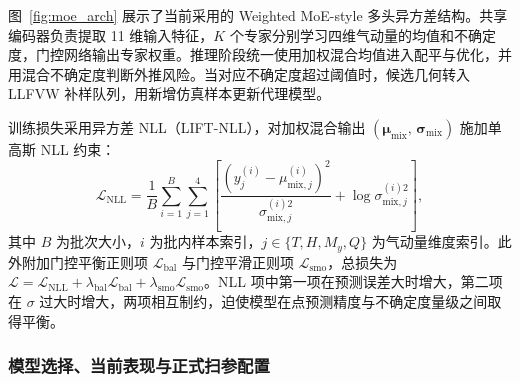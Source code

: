 图~\ref{fig:moe_arch} 展示了当前采用的 Weighted MoE-style 多头异方差结构。共享编码器负责提取 11 维输入特征，$K$ 个专家分别学习四维气动量的均值和不确定度，门控网络输出专家权重。推理阶段统一使用加权混合均值进入配平与优化，并用混合不确定度判断外推风险。当对应不确定度超过阈值时，候选几何转入 LLFVW 补样队列，用新增仿真样本更新代理模型。

训练损失采用异方差 NLL（LIFT-NLL），对加权混合输出 $(\bm{\mu}_{\mathrm{mix}},\,\bm{\sigma}_{\mathrm{mix}})$ 施加单高斯 NLL 约束：
\begin{equation}
\mathcal{L}_{\mathrm{NLL}} = \frac{1}{B}\sum_{i=1}^{B}\sum_{j=1}^{4}
\left[\frac{(y_j^{(i)} - \mu_{\mathrm{mix},j}^{(i)})^2}{\sigma_{\mathrm{mix},j}^{(i)2}} + \log\sigma_{\mathrm{mix},j}^{(i)2}\right],
\end{equation}
其中 $B$ 为批次大小，$i$ 为批内样本索引，$j \in \{T, H, M_y, Q\}$ 为气动量维度索引。此外附加门控平衡正则项 $\mathcal{L}_{\mathrm{bal}}$ 与门控平滑正则项 $\mathcal{L}_{\mathrm{smo}}$，总损失为 $\mathcal{L} = \mathcal{L}_{\mathrm{NLL}} + \lambda_{\mathrm{bal}}\mathcal{L}_{\mathrm{bal}} + \lambda_{\mathrm{smo}}\mathcal{L}_{\mathrm{smo}}$。NLL 项中第一项在预测误差大时增大，第二项在 $\sigma$ 过大时增大，两项相互制约，迫使模型在点预测精度与不确定度量级之间取得平衡。

\subsubsection{模型选择、当前表现与正式扫参配置}

